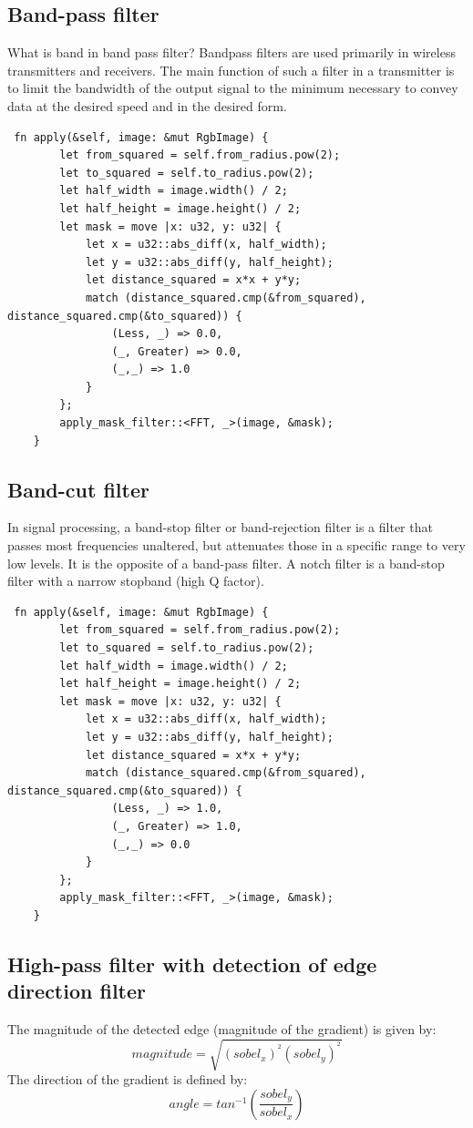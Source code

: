 \documentclass[12pt]{article}
\begin{document}
\subsection{Band-pass filter}
What is band in band pass filter?
Bandpass filters are used primarily in wireless transmitters and receivers. The main function of such a filter in a transmitter is to limit the bandwidth of the output signal to the minimum necessary to convey data at the desired speed and in the desired form.
\begin{lstlisting}
 fn apply(&self, image: &mut RgbImage) {
        let from_squared = self.from_radius.pow(2);
        let to_squared = self.to_radius.pow(2);
        let half_width = image.width() / 2;
        let half_height = image.height() / 2;
        let mask = move |x: u32, y: u32| {
            let x = u32::abs_diff(x, half_width);
            let y = u32::abs_diff(y, half_height);
            let distance_squared = x*x + y*y;
            match (distance_squared.cmp(&from_squared), distance_squared.cmp(&to_squared)) {
                (Less, _) => 0.0,
                (_, Greater) => 0.0,
                (_,_) => 1.0
            }
        };
        apply_mask_filter::<FFT, _>(image, &mask);
    }
\end{lstlisting}
\subsection{Band-cut filter}
In signal processing, a band-stop filter or band-rejection filter is a filter that passes most frequencies unaltered, but attenuates those in a specific range to very low levels. It is the opposite of a band-pass filter. A notch filter is a band-stop filter with a narrow stopband (high Q factor).
\begin{lstlisting}
 fn apply(&self, image: &mut RgbImage) {
        let from_squared = self.from_radius.pow(2);
        let to_squared = self.to_radius.pow(2);
        let half_width = image.width() / 2;
        let half_height = image.height() / 2;
        let mask = move |x: u32, y: u32| {
            let x = u32::abs_diff(x, half_width);
            let y = u32::abs_diff(y, half_height);
            let distance_squared = x*x + y*y;
            match (distance_squared.cmp(&from_squared), distance_squared.cmp(&to_squared)) {
                (Less, _) => 1.0,
                (_, Greater) => 1.0,
                (_,_) => 0.0
            }
        };
        apply_mask_filter::<FFT, _>(image, &mask);
    }
\end{lstlisting}
\subsection{High-pass filter with detection of edge direction filter}
The magnitude of the detected edge (magnitude of the gradient) is given by:
\begin{equation}
magnitude = \sqrt{\left ( sobel_x \right )^{^{2}}\left ( sobel_y \right )^{^{2}}}
\end{equation}
The direction of the gradient is defined by:
\begin{equation}
angle = tan^{-1}\left ( \frac{sobel_y}{sobel_x} \right )
\end{equation}
\end{document}
